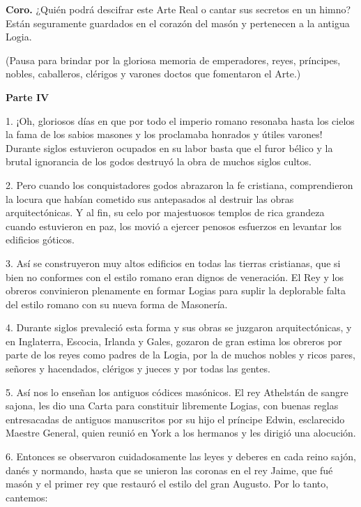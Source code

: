 \documentclass[a4paper,12pt,twoside]{book}
\begin{document}
\noindent \textbf{Coro.} ¿Quién podrá descifrar este Arte Real o cantar sus secretos en un himno? Están seguramente guardados en el corazón del masón y pertenecen a la antigua Logia.

\noindent (Pausa para brindar por la gloriosa memoria de emperadores, reyes, príncipes, nobles, caballeros, clérigos y varones doctos que fomentaron el Arte.)

\vspace{0.5cm}

\noindent \textbf{Parte IV}

1. ¡Oh, gloriosos días en que por todo el imperio romano resonaba hasta los cielos la fama de los sabios masones y los proclamaba honrados y útiles varones! Durante siglos estuvieron ocupados en su labor basta que el furor bélico y la brutal ignorancia de los godos destruyó la obra de muchos siglos cultos.

2. Pero cuando los conquistadores godos abrazaron la fe cristiana, comprendieron la locura que habían cometido sus antepasados al destruir las obras arquitectónicas. Y al fin, su celo por majestuosos templos de rica grandeza cuando estuvieron en paz, los movió a ejercer penosos esfuerzos en levantar los edificios góticos.

3. Así se construyeron muy altos edificios en todas las tierras cristianas, que si bien no conformes con el estilo romano eran dignos de veneración.
El Rey y los obreros convinieron plenamente en formar Logias para suplir la deplorable falta del estilo romano con su nueva forma de Masonería.

4. Durante siglos prevaleció esta forma y sus obras se juzgaron arquitectónicas, y en Inglaterra, Escocia, Irlanda y Gales, gozaron de gran estima los obreros por parte de los reyes como padres de la Logia, por la de muchos nobles y ricos pares, señores y hacendados, clérigos y jueces y por todas las gentes.

5. Así nos lo enseñan los antiguos códices masónicos. El rey Athelstán de sangre sajona, les dio una Carta para constituir libremente Logias, con buenas reglas entresacadas de antiguos manuscritos por su hijo el príncipe Edwin, esclarecido Maestre General, quien reunió en York a los hermanos y les dirigió una alocución.

6. Entonces se observaron cuidadosamente las leyes y deberes en cada reino sajón, danés y normando, hasta que se unieron las coronas en el rey Jaime, que fué masón y el primer rey que restauró el estilo del gran Augusto. Por lo tanto, cantemos:
\end{document}
